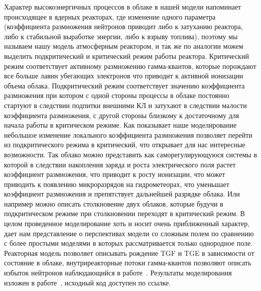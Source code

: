 Характер высокоэнергичных процессов в облаке в нашей модели напоминает происходящее в ядерных реакторах, где изменение одного параметра (коэффициента размножения нейтронов приводит либо к затуханию реактора, либо к стабильной выработке энергии, либо к взрыву топлива), поэтому мы называем нашу модель атмосферным реактором, и так же по аналогии можем выделить подкритический и критический режим работы реактора. Критический режим соответствует активному размножению гамма-квантов, которые порождают все больше лавин убегающих электронов что приводит к активной ионизации объема облака. Подкритический режим соответствует значению коэффициента размножения  при котором с одной стороны процессы в облаке постоянно стартуют в следствии подпитки внешними КЛ и затухают в следствии малости коэффициента размножения, с другой стороны  близкому к достаточному для начала работы в критическом режиме. Как показывает наше моделирование небольшое изменение локального коэффициента размножения позволяет перейти из подкритического режима в критический, что открывает для нас интересные возможности. Так облако можно представить как саморегулирующуюся системы в которой в следствии накопления заряда и роста электрического поля растет коэффициент размножения, что приводит к росту ионизации, что может приводить к появлению микроразрядов на гидрометеорах, что уменьшает коэффициент размножения и препятствует дальнейшей разрядке облака. Или например можно описать столкновение двух облаков, которые будучи в подкритическом режиме при столкновении переходят в критический режим. В целом проведенное моделирование хоть и носит очень приближенный характер, дает нам представление о перспективах модели со сложным полем по сравнению с более простыми моделями в которых рассматривается только однородное поле. Реакторная модель позволяет описывать рождение TGF и TGE в зависимости от состояние в облаке, внутриреакторные потоки гамма-квантов позволяют описать избыток нейтронов наблюдающийся в работе~\cite{gurevich2012strong}. Результаты моделирования изложен в работе~\cite{reactor}, исходный код доступен по ссылке.



